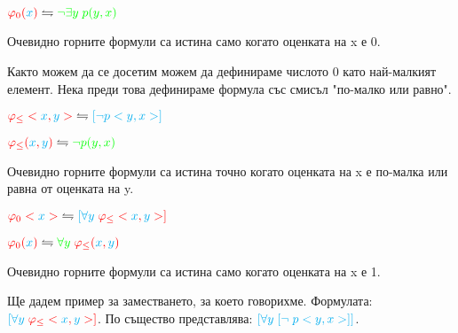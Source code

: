 \documentclass{article}[12pt]
\begin{document}
\(\color{red} \varphi_0(\color{cyan} x \color{red}) \color{black} \leftrightharpoons  \color{green}  \lnot \exists y \; p(y, x) \)

\vspace{0.3cm}

Очевидно горните формули са истина само когато оценката на x е 0.

\vspace{0.3cm}

Както можем да се досетим можем да дефинираме числото 0 като най-малкият елемент.
Нека преди това дефинираме формула със смисъл "по-малко или равно".

\vspace{0.3cm}

\(\color{red} \varphi_{\leq}<\color{cyan} x \color{red} , \color{cyan} y \color{red}> \; \color{black} \leftrightharpoons  \color{cyan}  [\lnot p<y, x> ] \)

\vspace{0.3cm}

\(\color{red} \varphi_{\leq}(\color{cyan} x \color{red} , \color{cyan} y \color{red}) \color{black} \leftrightharpoons  \color{green}  \lnot p(y, x) \)

\vspace{0.3cm}

Очевидно горните формули са истина точно когато оценката на x е по-малка или равна от оценката на y.

\vspace{0.3cm}

\(\color{red} \varphi_0<\color{cyan} x \color{red}> \color{black} \; \leftrightharpoons \color{cyan}  [\forall y \; \color{red} \varphi_{\leq}<\color{cyan} x \color{red} , \color{cyan} y \color{red}> ] \)

\vspace{0.3cm}

\(\color{red} \varphi_0(\color{cyan} x \color{red}) \color{black} \leftrightharpoons \color{green}  \forall y \; \color{red}\varphi_{\leq}(\color{cyan} x \color{red} , \color{cyan} y \color{red}) \)

\vspace{0.3cm}

Очевидно горните формули са истина само когато оценката на x е 1.

\vspace{0.3cm}

Ще дадем пример за заместването, за което говорихме.
Формулата: \\
\(\color{cyan}  [\forall y \; \color{red} \varphi_{\leq}<\color{cyan} x \color{red} , \color{cyan} y \color{red}> ] \).
По същество представлява:
\(\color{cyan}  [\forall y \; [\lnot \; p<y, x> ] ] \).
\end{document}

